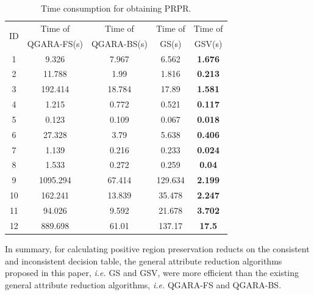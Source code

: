 \documentclass[review]{elsarticle}
\begin{document}
		\begin{table}[htbp]
			\centering
			\caption{Time consumption for obtaining PRPR.}
			\label{prprTime}
			\begin{tabular}{ccccc}
				\hline
				\multirow{2}{*}{ID} & Time of     & Time of & Time of     & Time of \\
				& QGARA-FS(s) & QGARA-BS(s)   & GS(s) & GSV(s)  \\ \hline
	      		1   &  9.326     & 7.967  & 6.562   & \textbf{1.676} \\
				2   &  11.788    & 1.99   & 1.816   & \textbf{0.213} \\
				3   &  192.414   & 18.784 & 17.89   & \textbf{1.581} \\
				4   &  1.215     & 0.772  & 0.521   & \textbf{0.117} \\
				5   &  0.123     & 0.109  & 0.067   & \textbf{0.018} \\
				6   &  27.328    & 3.79   & 5.638   & \textbf{0.406} \\
				7   &  1.139     & 0.216  & 0.233   & \textbf{0.024} \\
				8   &  1.533     & 0.272  & 0.259   & \textbf{0.04 } \\
				9   &  1095.294  & 67.414 & 129.634 & \textbf{2.199} \\
				10  &  162.241   & 13.839 & 35.478  & \textbf{2.247} \\
				11  &  94.026    & 9.592  & 21.678  & \textbf{3.702} \\
				12  &  889.698   & 61.01  & 137.17  & \textbf{17.5 } \\ \hline
			\end{tabular}
		\end{table}
		In summary, for calculating positive region preservation reducts on the consistent and inconsistent decision table, the general attribute reduction algorithms proposed in this paper, \emph{i.e.} GS and GSV, were more efficient than the existing general attribute reduction algorithms, \emph{i.e.} QGARA-FS and QGARA-BS.
\end{document}
